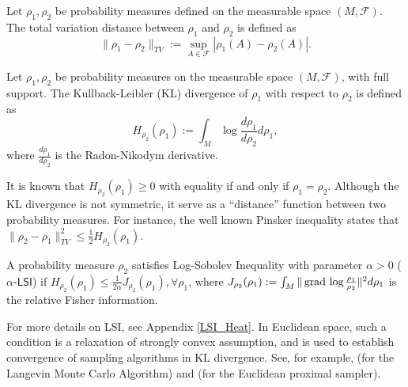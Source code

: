 \begin{definition}[TV distance]
Let $\rho_{1}, \rho_{2}$ be probability measures defined on the measurable space $(M, \mathcal{F})$. The total variation distance between $\rho_{1}$ and $\rho_{2}$ 
is defined as 
\begin{equation*}
    \|\rho_{1} - \rho_{2}\|_{TV} := \sup_{A \in \mathcal{F}} |\rho_{1}(A) - \rho_{2}(A)|.
\end{equation*}
\end{definition}

\begin{definition}[KL divergence] Let $\rho_{1}, \rho_{2}$ be probability measures on the measurable space $(M, \mathcal{F})$, with full support. 
The Kullback-Leibler (KL) divergence of $\rho_{1}$ with respect to $\rho_{2}$ is defined as
\begin{equation*}
    H_{\rho_{2}}(\rho_{1}) := \int_{M} \log \frac{d\rho_{1}}{d\rho_{2}} d\rho_{1},
\end{equation*}
where $\frac{d\rho_{1}}{d\rho_{2}}$ is the Radon-Nikodym derivative.
\end{definition}

It is known that $H_{\rho_{2}}(\rho_{1}) \ge 0$ with equality if and only if $\rho_{1} = \rho_{2}$. 
Although the KL divergence is not symmetric, it serve as a ``distance'' function between two probability measures. For instance, the well known Pinsker inequality states that $\|\rho_{2} - \rho_{1}\|_{TV}^{2} \le \frac{1}{2} H_{\rho_{2}}(\rho_{1})$. 


\begin{definition}
A probability measure $\rho_{2}$ satisfies Log-Sobolev Inequality with parameter $\alpha > 0$ ($\alpha$-$\mathsf{LSI}$) 
if $H_{\rho_{2}}(\rho_{1}) \le \frac{1}{2\alpha} J_{\rho_{2}}(\rho_{1}), \forall \rho_{1}$, where $J_{\rho_{2}}(\rho_{1}) := \int_{M} \|\operatorname{grad\,} \log \frac{\rho_{1}}{\rho_{2}}\|^{2} d\rho_{1}$ is the relative Fisher information.
\end{definition}

For more details on LSI, see Appendix \ref{LSI_Heat}.
In Euclidean space, such a condition is a relaxation of strongly convex assumption, and is used to establish convergence of sampling algorithms in KL divergence.
See, for example, \cite{vempala2019rapid} (for the Langevin Monte Carlo Algorithm) and \cite{chen2022improved} (for the Euclidean proximal sampler).

